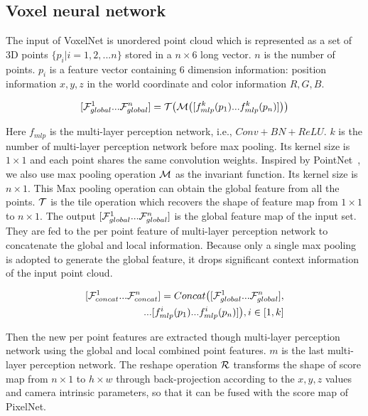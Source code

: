 \documentclass[letterpaper, 10 pt, conference]{ieeeconf}
\begin{document}
\subsection{Voxel neural network}\label{sec:3.3}
The input of VoxelNet is unordered point cloud which is represented as a set of 3D points $ \lbrace p_{i} \vert i = 1,2, ... n \rbrace $ stored in a $n \times 6$ long vector. $n$ is the number of points. $p_{i}$ is a feature vector containing 6 dimension information: position information $x, y, z$ in the world coordinate and color information $R, G, B$. 

\begin{equation}
\begin{split}
[{\cal F}^{1}_{global} ... {\cal F}^{n}_{global}] = {\cal T} \big( {\cal M} \big( [f_{mlp}^{k}(p_{1}) ... f_{mlp}^{k}(p_{n})] \big) \big)
\label{eq:VoxelNet1}
\end{split}
\end{equation}

Here $f_{mlp}$ is the multi-layer perception network, i.e., $Conv+BN+ReLU$. $k$ is the number of multi-layer perception network before max pooling. Its kernel size is $1 \times 1$ and each point shares the same convolution weights. Inspired by PointNet~\cite{qi2016pointnet}, we also use max pooling operation ${\cal M}$ as the invariant function. Its kernel size is $n \times 1$. This Max pooling operation can obtain the global feature from all the points. ${\cal T}$ is the tile operation which recovers the shape of feature map from $1 \times 1$ to $n \times 1$.  
The output $[{\cal F}^{1}_{global} ... {\cal F}^{n}_{global}]$ is the global feature map of the input set. They are fed to the per point feature of multi-layer perception network to concatenate the global and local information. Because only a single max pooling is adopted to generate the global feature, it drops significant context information of the input point cloud. 

\begin{equation}
\begin{split}
[{\cal F}^{1}_{concat} ... {\cal F}^{n}_{concat}] = Concat \big( [ {\cal F}^{1}_{global}... {\cal F}^{n}_{global} ],  \\
... [f_{mlp}^{i}(p_{1})... f_{mlp}^{i}(p_{n})] \big), i \in [1,k] 
\label{eq:VoxelNet2}
\end{split}
\end{equation}

Then the new per point features are extracted though multi-layer perception network using the global and local combined point features. $m$ is the last multi-layer perception network. The reshape operation ${\cal R}$ transforms the shape of score map from $n \times 1$ to $h \times w$ through back-projection according to the $x, y, z$ values and camera intrinsic parameters, so that it can be fused with the score map of PixelNet.  
\end{document}
